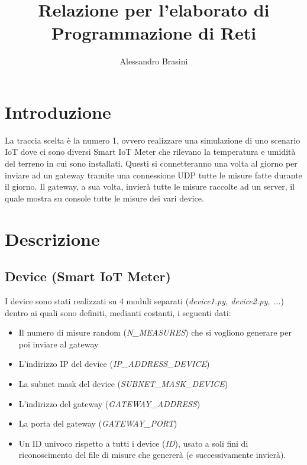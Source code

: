 \documentclass[a4paper, 14pt]{extreport}
\title{Relazione per l'elaborato di Programmazione di Reti}
\author{Alessandro Brasini}
\begin{document}
    \maketitle
    \tableofcontents

    \chapter{Introduzione}
    La traccia scelta è la numero 1, ovvero realizzare una simulazione di uno scenario IoT 
    dove ci sono diversi Smart IoT Meter che rilevano la temperatura e umidità del terreno in cui sono installati.
    Questi si connetteranno una volta al giorno per inviare ad un gateway tramite una connessione UDP tutte le
    misure fatte durante il giorno.
    Il gateway, a sua volta, invierà tutte le misure raccolte ad un server, il quale mostra su console tutte le misure
    dei vari device.

    \chapter{Descrizione}

    \section{Device (Smart IoT Meter)}
    I device sono stati realizzati su 4 moduli separati (\emph{device1.py, device2.py, ...})
    dentro ai quali sono definiti, medianti costanti, i seguenti dati:
    \begin{itemize}
        \item Il numero di misure random (\emph{N\_MEASURES}) che si vogliono generare per poi inviare al gateway
        \item L'indirizzo IP del device (\emph{IP\_ADDRESS\_DEVICE})
        \item La subnet mask del device (\emph{SUBNET\_MASK\_DEVICE})
        \item L'indirizzo del gateway (\emph{GATEWAY\_ADDRESS})
        \item La porta del gateway (\emph{GATEWAY\_PORT})
        \item Un ID univoco rispetto a tutti i device (\emph{ID}), usato a soli fini di riconoscimento
                del file di misure che genererà (e successivamente invierà).
    \end{itemize}
\end{document}
